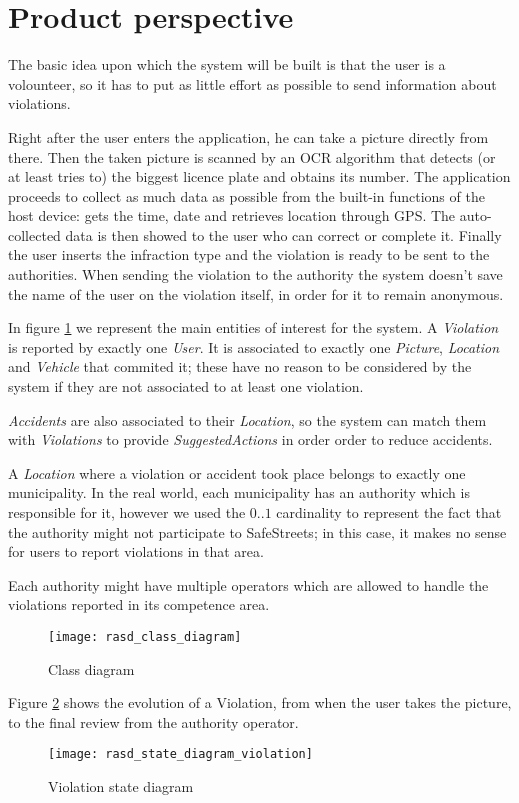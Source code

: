 \section{Product perspective}
The basic idea upon which the system will be built is that the user is a
volounteer, so it has to put as little effort as possible to send information
about violations.

Right after the user enters the application, he can take a picture directly from
there. Then the taken picture is scanned by an OCR algorithm that detects (or at
least tries to) the biggest licence plate and obtains its number. The
application proceeds to collect as much data as possible from the built-in
functions of the host device: gets the time, date and retrieves location through
GPS.
The auto-collected data is then showed to the user who can correct or
complete it. Finally the user inserts the infraction type and the violation is
ready to be sent to the authorities.
When sending the violation to the authority the system doesn't save the name
of the user on the violation itself, in order for it to remain anonymous.

In figure \ref{fig:classDiagram} we represent the main entities of interest
for the system.
A \emph{Violation} is reported by exactly one \emph{User}. It is associated to
exactly one \emph{Picture}, \emph{Location} and \emph{Vehicle} that commited it;
these have no reason to be considered by the system if they are not associated
to at least one violation.

\emph{Accidents} are also associated to their \emph{Location}, so the system can
match them with \emph{Violations} to provide \emph{SuggestedActions} in order
order to reduce accidents.

A \emph{Location} where a violation or accident took place belongs to exactly
one municipality. In the real world, each municipality has an authority which is
responsible for it, however we used the $0..1$ cardinality to represent the
fact that the authority might not participate to SafeStreets; in this case, it
makes no sense for users to report violations in that area.

Each authority might have multiple operators which are allowed to handle the
violations reported in its competence area.

\begin{figure}[H]
    \centering
    \texttt{[image: rasd\_class\_diagram]}
    \caption{Class diagram}
    \label{fig:classDiagram}
\end{figure}

Figure \ref{fig:violationDiagram} shows the evolution of a Violation, from when
the user takes the picture, to the final review from the authority operator.

\begin{figure}[H]
    \centering
    \texttt{[image: rasd\_state\_diagram\_violation]}
    \caption{Violation state diagram}
    \label{fig:violationDiagram}
\end{figure}